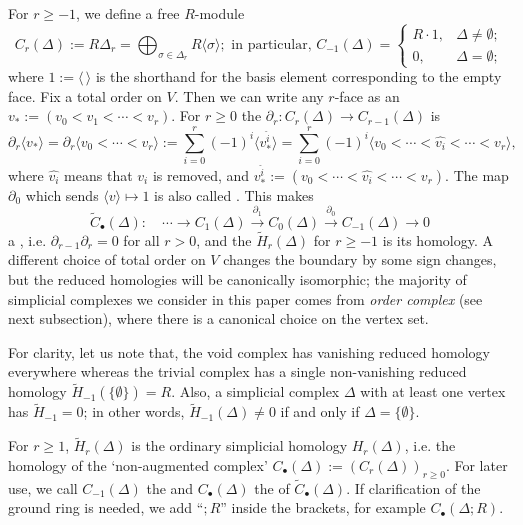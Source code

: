 \documentclass[a4paper,leqno]{amsart}
\begin{document}
For $r\geq-1$, we define a free $R$-module
\[
C_r(\Delta):= R\Delta_r = \bigoplus_{\sigma\in \Delta_r} R \langle \sigma\rangle; \text{ in particular, }C_{-1}(\Delta)= \begin{cases}
    R \cdot 1, & \Delta\neq \emptyset;\\
    0, & \Delta=\emptyset;
\end{cases}
\]
where $1:=\langle\,\rangle$ is the shorthand for the basis element corresponding to the empty face. 
Fix a total order on $V$.  Then we can write any $r$-face as an   $v_\ast := (v_0<v_1<\cdots <v_r)$. 
For $r\geq0$ the  $\partial_r\colon C_r(\Delta)\to C_{r-1}(\Delta)$ is
\[
\partial_r\langle v_\ast\rangle =\partial_r\langle v_0<\cdots<v_r\rangle:= \sum_{i=0}^{r}(-1)^i \langle v_*^{\widehat{i}}\rangle=\sum_{i=0}^{r}(-1)^i\langle v_0<\cdots<\widehat{v_i}<\cdots<v_r\rangle,
\]
where $\widehat{v_i}$ means that $v_i$ is removed, and $v_*^{\widehat{i}}:=( v_0<\cdots<\widehat{v_i}<\cdots<v_r)$.
The map $\partial_0$ which sends $\langle v\rangle\mapsto 1$ is also called . 
This makes 
\[
\widetilde C_\bullet(\Delta)\colon\quad\cdots\longrightarrow C_1(\Delta)\xrightarrow{\partial_1}C_0(\Delta)\xrightarrow{\partial_0}C_{-1}(\Delta)\longrightarrow0
\]
a , i.e. $\partial_{r-1}\partial_r=0$ for all $r>0$, and the  $\widetilde H_r(\Delta)$ for $r\geq-1$ is its homology.
A different choice of total order on $V$ changes the boundary by some sign changes, but the reduced homologies will be canonically isomorphic; the majority of simplicial complexes we consider in this paper comes from \emph{order complex} (see next subsection), where there is a canonical choice on the vertex set.

For clarity, let us note that, the void complex has vanishing reduced homology everywhere whereas the trivial complex has a single non-vanishing reduced homology $\widetilde{H}_{-1}(\{\emptyset\})=R$. 
Also, a simplicial complex $\Delta$ with at least one vertex has $\widetilde H_{-1}=0$; in other words, $\widetilde H_{-1}(\Delta)\neq0$ if and only if $\Delta=\{\emptyset\}$. 

For $r\geq1$, $\widetilde H_r(\Delta)$ is the ordinary simplicial homology $H_r(\Delta)$, i.e. the homology of the `non-augmented complex' $C_\bullet(\Delta):=(C_r(\Delta))_{r\geq0}$.
For later use, we call $C_{-1}(\Delta)$ the  and $C_\bullet(\Delta)$ the  of $\widetilde C_\bullet(\Delta)$. 
If clarification of the ground ring is needed, we add ``$;R$'' inside the brackets, for example $C_\bullet(\Delta;R)$. 
\end{document}

